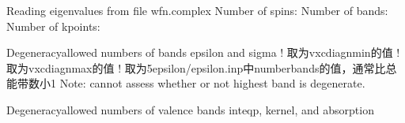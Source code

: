 \documentclass[a4paper,12pt,english]{sphinxmanual}
\begin{document}
\begin{sphinxVerbatim}[commandchars=\\\{\}]
Reading eigenvalues from file wfn.complex
Number of spins:               
Number of bands:              
Number of k\PYGZhy{}points:           

 Degeneracy\PYGZhy{}allowed numbers of bands  epsilon and sigma 
            ! 取为vxc\PYGZus{}diag\PYGZus{}nmin的值
           ! 取为vxc\PYGZus{}diag\PYGZus{}nmax的值
            ! 取为5\PYGZhy{}epsilon/epsilon.inp中number\PYGZus{}bands的值，通常比总能带数小1
Note: cannot assess whether or not highest band      is degenerate.

 Degeneracy\PYGZhy{}allowed numbers of valence bands  inteqp, kernel, and absorption 


\end{sphinxVerbatim}
\end{document}
